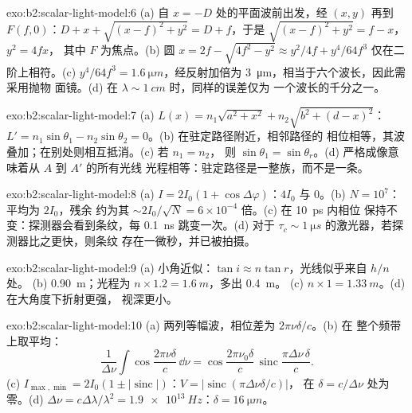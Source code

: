 \begin{solution}{exo:b2:scalar-light-model:6}
(a) 自 $x = -D$ 处的平面波前出发，经 $(x, y)$ 再到 $F(f, 0)$：$D + x
+ \sqrt{(x - f)^2 + y^2} = D + f$，于是 $\sqrt{(x - f)^2 + y^2} = f - x$，$y^2 = 4fx$，
其中 $F$ 为焦点。(b) 圆 $x = 2f - \sqrt{4f^2 - y^2} \approx y^2/4f +
y^4/64f^3$ 仅在二阶上相符。(c) $y^4/64f^3 = \qty{1.6}{\micro m}$，经反射加倍为
\qty{3}{\micro m}，相当于六个波长，因此需采用抛物
面镜。(d) 在 $\lambda \sim \qty{1}{cm}$ 时，同样的误差仅为
一个波长的千分之一。
\end{solution}

\begin{solution}{exo:b2:scalar-light-model:7}
(a) $L(x) = n_1\sqrt{a^2 + x^2} + n_2\sqrt{b^2 + (d - x)^2}$：$L' = n_1\sin\theta_1 -
n_2\sin\theta_2 = 0$。(b) 在驻定路径附近，相邻路径的
相位相等，其波叠加；在别处则相互抵消。(c) 若 $n_1 = n_2$，
则 $\sin\theta_1 = \sin\theta_r$。(d) 严格成像意味着从 $A$ 到 $A'$ 的所有光线
光程相等：驻定路径是一整族，而不是一条。
\end{solution}

\begin{solution}{exo:b2:scalar-light-model:8}
(a) $I = 2I_0(1 + \cos\Delta\varphi)$：$4I_0$ 与 $0$。(b) $N = 10^7$：平均为 $2I_0$，残余
约为其 $\sim 2I_0/\sqrt N = 6 \times 10^{-4}$ 倍。(c) 在 \qty{10}{ps} 内相位
保持不变：探测器会看到条纹，每 \qty{0.1}{ns} 跳变一次。(d) 对于
$\tau_c \sim \qty{1}{\micro s}$ 的激光器，若探测器比之更快，则条纹
存在一微秒，并已被拍摄。
\end{solution}

\begin{solution}{exo:b2:scalar-light-model:9}
(a) 小角近似：$\tan i \approx n\tan r$，光线似乎来自 $h/n$ 处。
(b) \qty{0.90}{m}；光程为 $n \times 1.2 = \qty{1.6}{m}$，多出 \qty{0.4}{m}。
(c) $n \times 1 = \qty{1.33}{m}$。(d) 在大角度下折射更强，
视深更小。
\end{solution}

\begin{solution}{exo:b2:scalar-light-model:10}
(a) 两列等幅波，相位差为 $2\pi\nu\delta/c$。(b) 在
整个频带上取平均：
\[
\frac1{\Delta\nu}\int\cos\frac{2\pi\nu\delta}c\,\dd\nu = \cos\frac{2\pi\nu_0\delta}c\,\operatorname{sinc}\frac{\pi\Delta\nu\,\delta}c .
\]
(c)
$I_{\max, \min} = 2I_0(1 \pm |\operatorname{sinc}|)$：$V = |\operatorname{sinc}(\pi\Delta\nu\delta/c)|$，
在 $\delta = c/\Delta\nu$ 处为零。(d) $\Delta\nu = c\Delta\lambda/\lambda^2 = \qty{1.9e13}{Hz}$：$\delta =
\qty{16}{\micro m}$。
\end{solution}


